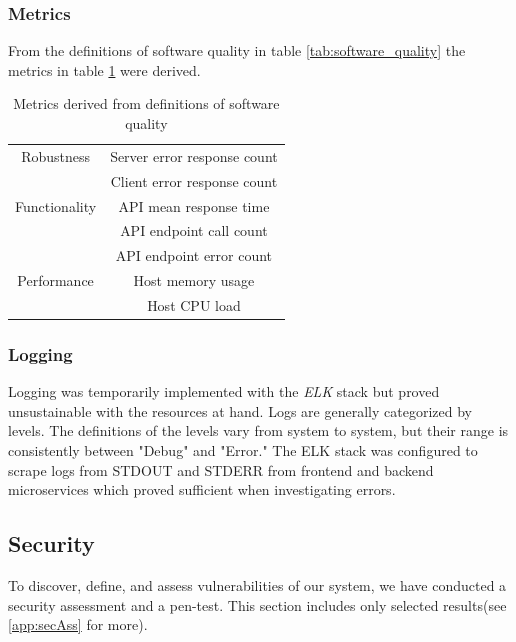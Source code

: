\subsubsection{Metrics}
From the definitions of software quality in table \ref{tab:software_quality} the metrics in table \ref{tab:metrics} were derived.

\begin{table}[H]
    \centering
    \begin{tabular}{|c|c|} \hline
        Robustness & Server error response count \\
        & Client error response count \\ \hline
        Functionality & API mean response time  \\ 
        & API endpoint call count \\
        & API endpoint error count  \\ \hline
        Performance & Host memory usage \\
        & Host CPU load \\ \hline
    \end{tabular}
    \caption{Metrics derived from definitions of software quality}
    \label{tab:metrics}
\end{table}

\subsubsection{Logging}
Logging was temporarily implemented with the \textit{ELK} stack but proved unsustainable with the resources at hand.
Logs are generally categorized by levels. 
The definitions of the levels vary from system to system, but their range is consistently between "Debug" and "Error."
The ELK stack was configured to scrape logs from STDOUT and STDERR from frontend and backend microservices which proved sufficient when investigating errors.

\subsection{Security}
\label{subsec:security}
To discover, define, and assess vulnerabilities of our system, we have conducted a security assessment and a pen-test. This section includes only selected results(see \ref{app:secAss} for more).


